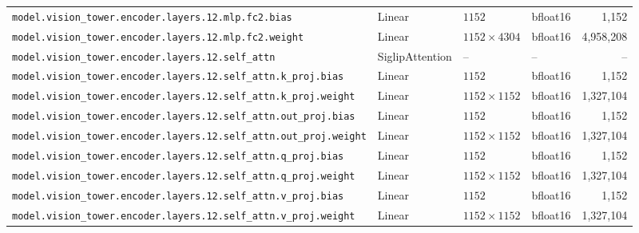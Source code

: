 \documentclass[10pt,a4paper]{article}
\theoremstyle{definition}
\begin{document}
\begin{appendices}
{\begin{longtable}{p{6.8cm}>{\raggedright\arraybackslash}p{3.3cm}llr}
\texttt{model.\allowbreak{}vision\_tower.\allowbreak{}encoder.\allowbreak{}layers.\allowbreak{}12.\allowbreak{}mlp.\allowbreak{}fc2.\allowbreak{}bias} & Linear & $1152$ & bfloat16 & 1,152 \\
\texttt{model.\allowbreak{}vision\_tower.\allowbreak{}encoder.\allowbreak{}layers.\allowbreak{}12.\allowbreak{}mlp.\allowbreak{}fc2.\allowbreak{}weight} & Linear & $1152 \times 4304$ & bfloat16 & 4,958,208 \\
\texttt{model.\allowbreak{}vision\_tower.\allowbreak{}encoder.\allowbreak{}layers.\allowbreak{}12.\allowbreak{}self\_attn} & Siglip\allowbreak{}Attention & -- & -- & -- \\
\texttt{model.\allowbreak{}vision\_tower.\allowbreak{}encoder.\allowbreak{}layers.\allowbreak{}12.\allowbreak{}self\_attn.\allowbreak{}k\_proj.\allowbreak{}bias} & Linear & $1152$ & bfloat16 & 1,152 \\
\texttt{model.\allowbreak{}vision\_tower.\allowbreak{}encoder.\allowbreak{}layers.\allowbreak{}12.\allowbreak{}self\_attn.\allowbreak{}k\_proj.\allowbreak{}weight} & Linear & $1152 \times 1152$ & bfloat16 & 1,327,104 \\
\texttt{model.\allowbreak{}vision\_tower.\allowbreak{}encoder.\allowbreak{}layers.\allowbreak{}12.\allowbreak{}self\_attn.\allowbreak{}out\_proj.\allowbreak{}bias} & Linear & $1152$ & bfloat16 & 1,152 \\
\texttt{model.\allowbreak{}vision\_tower.\allowbreak{}encoder.\allowbreak{}layers.\allowbreak{}12.\allowbreak{}self\_attn.\allowbreak{}out\_proj.\allowbreak{}weight} & Linear & $1152 \times 1152$ & bfloat16 & 1,327,104 \\
\texttt{model.\allowbreak{}vision\_tower.\allowbreak{}encoder.\allowbreak{}layers.\allowbreak{}12.\allowbreak{}self\_attn.\allowbreak{}q\_proj.\allowbreak{}bias} & Linear & $1152$ & bfloat16 & 1,152 \\
\texttt{model.\allowbreak{}vision\_tower.\allowbreak{}encoder.\allowbreak{}layers.\allowbreak{}12.\allowbreak{}self\_attn.\allowbreak{}q\_proj.\allowbreak{}weight} & Linear & $1152 \times 1152$ & bfloat16 & 1,327,104 \\
\texttt{model.\allowbreak{}vision\_tower.\allowbreak{}encoder.\allowbreak{}layers.\allowbreak{}12.\allowbreak{}self\_attn.\allowbreak{}v\_proj.\allowbreak{}bias} & Linear & $1152$ & bfloat16 & 1,152 \\
\texttt{model.\allowbreak{}vision\_tower.\allowbreak{}encoder.\allowbreak{}layers.\allowbreak{}12.\allowbreak{}self\_attn.\allowbreak{}v\_proj.\allowbreak{}weight} & Linear & $1152 \times 1152$ & bfloat16 & 1,327,104 \\

\end{longtable}}
\end{appendices}
\end{document}
